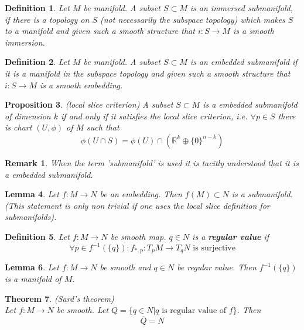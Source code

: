 \documentclass{article}
\newtheorem{theorem}{Theorem}
\numberwithin{theorem}{section}
\newtheorem{lemma}[theorem]{Lemma}
\newtheorem{proposition}[theorem]{Proposition}
\newtheorem{definition}[theorem]{Definition}
\newtheorem*{remark}{Remark}
\newcommand{\R}{\mathbb{R}}
\newcommand{\1}{\mathds{1}}
\begin{document}
\begin{definition}
    Let $M$ be manifold. A subset $S \subset M$ is an immersed submanifold, if there is a topology on $S$ (not necessarily the subspace topology) which makes $S$ to a manifold and given such a smooth structure that $i: S \to M$ is a smooth immersion. 
\end{definition}

\begin{definition}
    Let $M$ be manifold. A subset $S\subset M$ is an embedded submanifold if it is a manifold in the subspace topology and given such a smooth structure that $i : S \to M$ is a smooth embedding. 
\end{definition}

\begin{proposition}(local slice criterion)
    A subset $S\subset M$ is a embedded submanifold of dimension $k$ if and only if it satisfies the local slice criterion, i.e. $\forall p \in S$ there is chart $(U, \phi)$ of $M$ such that 
    \[ \phi( U \cap S) = \phi(U) \cap (\R^{k} \oplus \{ 0 \}^{n-k} )\]
\end{proposition}

\begin{remark}
    When the term 'submanifold' is used it is tacitly understood that it is a embedded submanifold. 
\end{remark}

\begin{lemma}
    Let $f: M \to N$ be an embedding. Then $f(M) \subset N$ is a submanifold. (This statement is only non trivial if one uses the local slice definition for submanifolds). 
\end{lemma}

\begin{definition}
    Let $f: M \to N$ be smooth map. $q \in N$ is a \textbf{regular value} if 
    \[ \forall p \in f^{-1}(\{ q \}) : f_{*,p}: T_pM \to T_qN \text{ is surjective} \]
\end{definition}

\begin{lemma}
    Let $f: M \to N$ be smooth and $q \in N$ be regular value. Then $f^{-1}(\{ q \})$ is a manifold of $M$. 
\end{lemma}


\begin{theorem}(Sard's theorem)\\
    Let $f: M \to N$ be smooth. Let $Q= \{ q \in N | q \text{ is regular value of } f \} $. Then 
    \[ \overline{Q} = N \]
\end{theorem}
\end{document}
